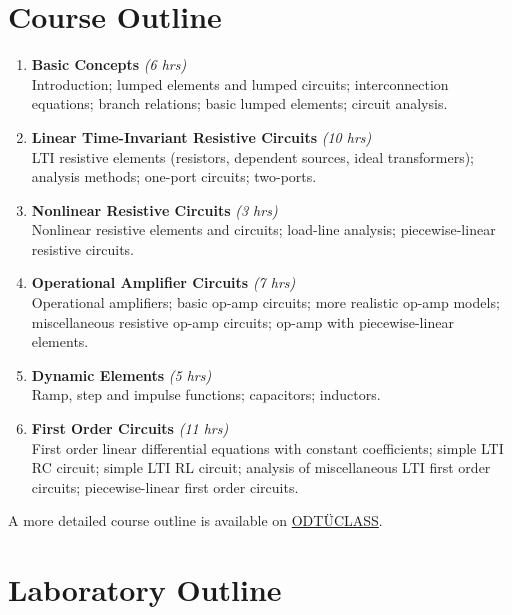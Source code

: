 \documentclass[10pt,a4paper]{article}
\newcommand{\odtuclass}{https://odtuclass.metu.edu.tr}
\begin{document}
\section{Course Outline}

\begin{enumerate}[leftmargin=1.5em,labelsep=0.4em]
  \item \textbf{Basic Concepts} \hfill \textit{(6 hrs)}\\
        Introduction; lumped elements and lumped circuits; interconnection equations;
        branch relations; basic lumped elements; circuit analysis.
  \item \textbf{Linear Time-Invariant Resistive Circuits} \hfill \textit{(10 hrs)}\\
        LTI resistive elements (resistors, dependent sources, ideal transformers);
        analysis methods; one-port circuits; two-ports.
  \item \textbf{Nonlinear Resistive Circuits} \hfill \textit{(3 hrs)}\\
        Nonlinear resistive elements and circuits; load-line analysis;
        piecewise-linear resistive circuits.
  \item \textbf{Operational Amplifier Circuits} \hfill \textit{(7 hrs)}\\
        Operational amplifiers; basic op-amp circuits; more realistic op-amp models;
        miscellaneous resistive op-amp circuits; op-amp with piecewise-linear elements.
  \item \textbf{Dynamic Elements} \hfill \textit{(5 hrs)}\\
        Ramp, step and impulse functions; capacitors; inductors.
  \item \textbf{First Order Circuits} \hfill \textit{(11 hrs)}\\
        First order linear differential equations with constant coefficients; simple LTI RC
        circuit; simple LTI RL circuit; analysis of miscellaneous LTI first order circuits;
        piecewise-linear first order circuits.
\end{enumerate}

\vspace{-0.2em}
{\footnotesize A more detailed course outline is available on \href{\odtuclass}{ODTÜCLASS}.}

\section{Laboratory Outline}
\end{document}
